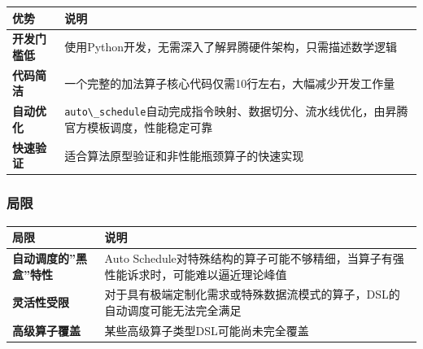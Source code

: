 \begin{longtable}[]{@{}
  >{\raggedright\arraybackslash}p{}
  >{\raggedright\arraybackslash}p{}@{}}
\toprule\noalign{}
\begin{minipage}[b]{\linewidth}\raggedright
优势
\end{minipage} & \begin{minipage}[b]{\linewidth}\raggedright
说明
\end{minipage} \\
\midrule\noalign{}
\endhead
\bottomrule\noalign{}
\endlastfoot
\textbf{开发门槛低} &
使用Python开发，无需深入了解昇腾硬件架构，只需描述数学逻辑 \\
\textbf{代码简洁} &
一个完整的加法算子核心代码仅需10行左右，大幅减少开发工作量 \\
\textbf{自动优化} &
\passthrough{\lstinline!auto\_schedule!}自动完成指令映射、数据切分、流水线优化，由昇腾官方模板调度，性能稳定可靠 \\
\textbf{快速验证} & 适合算法原型验证和非性能瓶颈算子的快速实现 \\
\end{longtable}

\subsubsection{局限}\label{src-book-chapter7-h32}

\begin{longtable}[]{@{}
  >{\raggedright\arraybackslash}p{}
  >{\raggedright\arraybackslash}p{}@{}}
\toprule\noalign{}
\begin{minipage}[b]{\linewidth}\raggedright
局限
\end{minipage} & \begin{minipage}[b]{\linewidth}\raggedright
说明
\end{minipage} \\
\midrule\noalign{}
\endhead
\bottomrule\noalign{}
\endlastfoot
\textbf{自动调度的''黑盒''特性} & Auto
Schedule对特殊结构的算子可能不够精细，当算子有强性能诉求时，可能难以逼近理论峰值 \\
\textbf{灵活性受限} &
对于具有极端定制化需求或特殊数据流模式的算子，DSL的自动调度可能无法完全满足 \\
\textbf{高级算子覆盖} & 某些高级算子类型DSL可能尚未完全覆盖 \\
\end{longtable}

